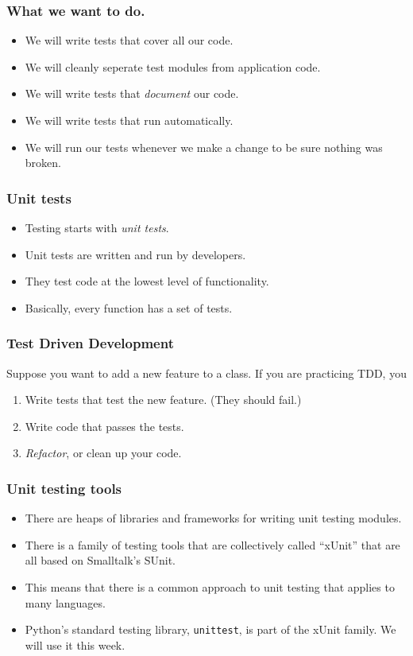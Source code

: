 \documentclass[10pt]{beamer}
\begin{document}
\begin{frame}
	\frametitle{What we want to do.}
	\begin{itemize}
		\item We will write tests that cover all our code.
		\item We will cleanly seperate test modules from 
			application code.
		\item We will write tests that \emph{document} our
			code.
		\item We will write tests that run automatically.
		\item We will run our tests whenever we make a 
			change to be sure nothing was broken.
	\end{itemize}
\end{frame}

\begin{frame}
	\frametitle{Unit tests}

	\begin{itemize}
		\item Testing starts with \emph{unit tests}.
		\item Unit tests are written and run by developers.
		\item They test code at the lowest level of functionality.
		\item Basically, every function has a set of tests.
	\end{itemize}
\end{frame}

\begin{frame}
	\frametitle{Test Driven Development}

	Suppose you want to add a new feature to a class.
	If you are practicing TDD, you

	\begin{enumerate}
		\item Write tests that test the new feature.
			(They should fail.)
		\item Write code that passes the tests.
		\item \emph{Refactor}, or clean up your code.
	\end{enumerate}

\end{frame}

\begin{frame}
	\frametitle{Unit testing tools}
	\begin{itemize}
		\item There are heaps of libraries and 
			frameworks for writing unit testing modules.
		\item There is a family of testing tools that 
			are collectively called ``xUnit'' that are
			all based on Smalltalk's SUnit.
		\item This means that there is a common approach
			to unit testing that applies to many languages.
		\item Python's standard testing library, \texttt{unittest},
			is part of the xUnit family.  We will use it this week.
	\end{itemize}
\end{frame}
\end{document}
